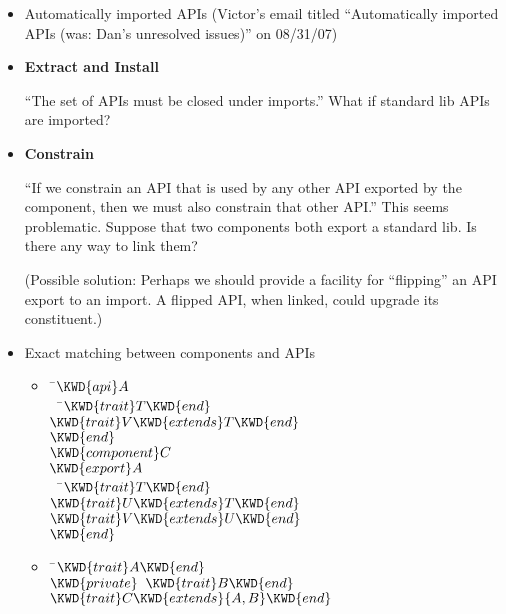 \begin{itemize}
\item Automatically imported APIs (Victor's email titled
``Automatically imported APIs (was: Dan's unresolved issues)'' on 08/31/07)

  \item {} {\bf Extract and Install}

``The set of APIs must be closed under imports.'' What if standard
  lib APIs are imported?
  \item {} {\bf Constrain}

 ``If we constrain an
  API that is used by any other API exported by the component, then we must
  also constrain that other API.'' This seems problematic. Suppose that two
  components both export a standard lib. Is there any way to link them?

(Possible solution: Perhaps we should provide a facility for ``flipping''
an API export to an import. A flipped API, when linked, could upgrade its
constituent.)

  \item Exact matching between components and APIs
    \begin{itemize}
    \item
%
\begin{Fortress}
{\tt~}\pushtabs\=\+\( \KWD{api} A\)\\
{\tt~~}\pushtabs\=\+\(   \KWD{trait} T \KWD{end}\)\\
\(   \KWD{trait} V \KWD{extends} T \KWD{end}\)\-\\\poptabs
\( \KWD{end}\)\\[4pt]
\( \KWD{component} C\)\\
\( \KWD{export} A\)\\
{\tt~~}\pushtabs\=\+\(   \KWD{trait} T \KWD{end}\)\\
\(   \KWD{trait} U \KWD{extends} T \KWD{end}\)\\
\(   \KWD{trait} V \KWD{extends} U \KWD{end}\)\-\\\poptabs
\( \KWD{end}\)\-\\\poptabs
\end{Fortress}
    \item
\begin{Fortress}
{\tt~}\pushtabs\=\+\( \KWD{trait} A \KWD{end}\)\\
\( \KWD{private}\;\;\KWD{trait} B \KWD{end}\)\\
\( \KWD{trait} C \KWD{extends} \{A,B\} \KWD{end}\)\-\\\poptabs
\end{Fortress}
    \end{itemize}


\end{itemize}
